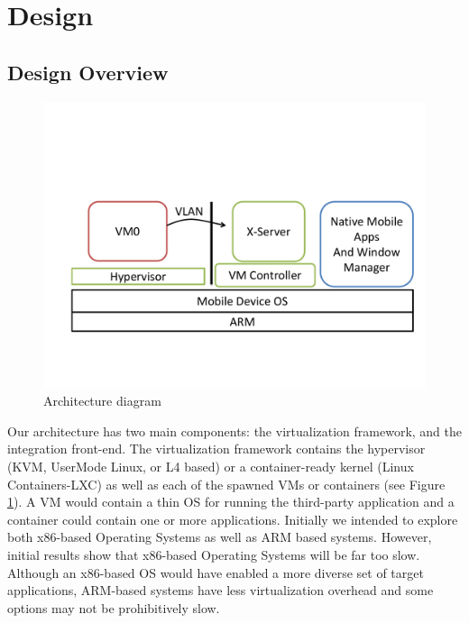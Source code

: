 \section{Design}
\label{sec:design}
\subsection{Design Overview}

\begin{figure}[tb]
\centering
\includegraphics[width=1.5\columnwidth]{arch}
\caption{Architecture diagram}
\label{fig:arch}
\end{figure}

\label{sec:proposedarch}
Our architecture has two main components: the virtualization framework, and the integration front-end.  The virtualization framework contains the hypervisor (KVM, UserMode Linux, or L4 based) or a container-ready kernel (Linux Containers-LXC) as well as each of the spawned VMs or containers (see Figure \ref{fig:arch}).  A VM would contain a thin OS for running the third-party application and a container could contain one or more applications.  Initially we intended to explore both x86-based Operating Systems as well as ARM based systems.  However, initial results show that x86-based Operating Systems will be far too slow.  Although an x86-based OS would have enabled a more diverse set of target applications, ARM-based systems have less virtualization overhead and some options may not be prohibitively slow. %

